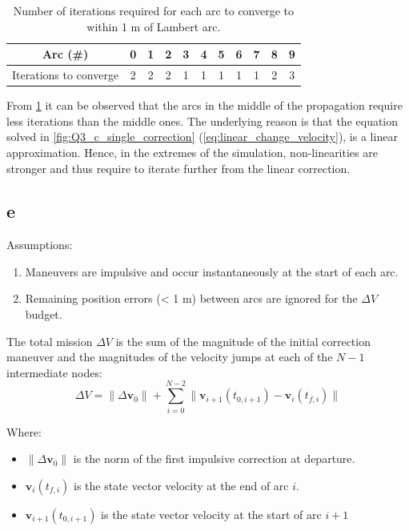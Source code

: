 \documentclass{report}
\begin{document}
\begin{table}[H]
    \centering
    \caption{Number of iterations required for each arc to converge to within 1 m of Lambert arc.}
    \label{tab:Q3_d_convergence}
    \begin{tabular}{|c|c|c|c|c|c|c|c|c|c|c|}
        \hline
        Arc (\#) & 0 & 1 & 2 & 3 & 4 & 5 & 6 & 7 & 8 & 9 \\
        \hline
        Iterations to converge & 2 & 2 & 2 & 1 & 1 & 1 & 1 & 1 & 2 & 3 \\
        \hline
    \end{tabular}
\end{table}

From \ref{tab:Q3_d_convergence} it can be observed that the arcs in the middle of the propagation require less iterations than the middle ones.
The underlying reason is that the equation solved in \ref{fig:Q3_c_single_correction} (\ref{eq:linear_change_velocity}), is a linear approximation. 
Hence, in the extremes of the simulation, non-linearities are stronger and thus require to iterate further from the linear correction.

\subsection*{e}

Assumptions:
\begin{enumerate}
    \item Maneuvers are impulsive and occur instantaneously at the start of each arc.
    \item Remaining position errors (< 1 m) between arcs are ignored for the $\Delta V$ budget.
\end{enumerate}

The total mission $\Delta V$ is the sum of the magnitude of the initial correction maneuver and the magnitudes of the velocity jumps at each of the $N-1$ intermediate nodes:
\begin{equation}
    \Delta V = \|\Delta \mathbf{v}_0\| + \sum_{i=0}^{N-2} \|\mathbf{v}_{i+1}(t_{0,i+1}) - \mathbf{v}_i(t_{f,i})\|
\end{equation}

Where:
\begin{itemize}
    \item $\|\Delta \mathbf{v}_0\|$ is the norm of the first impulsive correction at departure.
    \item $\mathbf{v}_i(t_{f,i})$ is the state vector velocity at the end of arc $i$.
    \item $\mathbf{v}_{i+1}(t_{0,i+1})$ is the state vector velocity at the start of arc $i+1$
\end{itemize}
\end{document}
